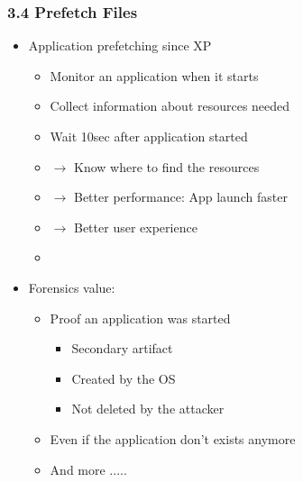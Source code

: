 \begin{frame}[fragile]
  \frametitle{3.4 Prefetch Files}
    \begin{itemize}
	\item Application prefetching since XP
        \begin{itemize}
            \item Monitor an application when it starts
            \item Collect information about resources needed
            \item Wait 10sec after application started
	    \item[] $\to$ Know where to find the resources
            \item[] $\to$ Better performance: App launch faster
            \item[] $\to$ Better user experience
	    \item[]
        \end{itemize}
	\item Forensics value:
        \begin{itemize}
            \item Proof an application was started
            \begin{itemize}
                \item Secondary artifact
                \item Created by the OS
                \item Not deleted by the attacker
            \end{itemize}
            \item Even if the application don't exists anymore
            \item And more .....
        \end{itemize}
    \end{itemize}
\end{frame}


